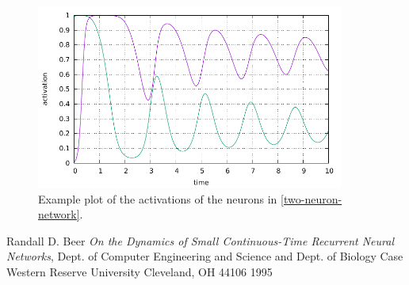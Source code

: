 \documentclass[a4paper]{article}
\begin{document}
\begin{figure}[h]
  \caption{Example plot of the activations of the neurons in \ref{two-neuron-network}.}
  \includegraphics[width=0.9\textwidth]{plot.pdf}
\end{figure}

\begin{thebibliography}{9}

  Randall D. Beer
  \textit{On the Dynamics of Small Continuous-Time Recurrent Neural Networks},
  Dept. of Computer Engineering and Science and Dept. of Biology
  Case Western Reserve University
  Cleveland, OH 44106
  1995

\end{thebibliography}
\end{document}
